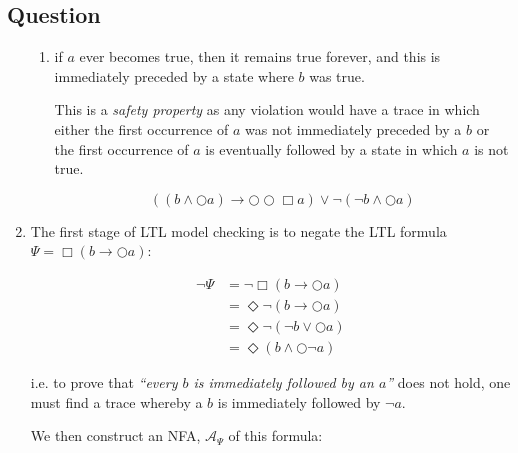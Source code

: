 \documentclass[12pt,a4paper]{article}
\newcounter{question}\setcounter{question}{1}
\newenvironment{question}{%
\subsection*{Question \arabic{question}}}%
{\stepcounter{question}}
\begin{document}
\begin{question}
\begin{enumerate}[label= (\alph*)]
\begin{enumerate}[label= (\roman*)]
            \item
                  if $a$ ever becomes true, then it remains true forever, and this is immediately preceded by a state where $b$ was true.


                  This is a \textit{safety property}  as any violation would have a trace in which either the first occurrence of $a$ was not immediately preceded by a $b$ or the first occurrence of $a$ is eventually followed by a state in which $a$ is not true.

                  \[
                  ((b \wedge \bigcirc a ) \rightarrow \bigcirc \bigcirc \Box a) \vee \neg (\neg b \wedge \bigcirc a)
                  \]

          \end{enumerate}
    \item
          The first stage of LTL model checking is to negate the LTL formula $\Psi = \Box(b \rightarrow \bigcirc a)$:

          \begin{align*}
            \neg \Psi &= \neg\Box(b \rightarrow \bigcirc a) \\
                &= \Diamond \neg( b \rightarrow \bigcirc a ) \\
                &= \Diamond \neg (\neg b \vee \bigcirc a)\\
                &= \Diamond ( b \wedge \bigcirc \neg a )
          \end{align*}

          i.e. to prove that \textit{``every $b$ is immediately followed by an $a$''} does not hold, one must find a trace whereby a $b$ is immediately followed by $\neg a$.

          We then construct an NFA, $\mathcal{A}_{\Psi}$ of this formula:

          \begin{center}
          \end{center}



\end{enumerate}
\end{question}
\end{document}
